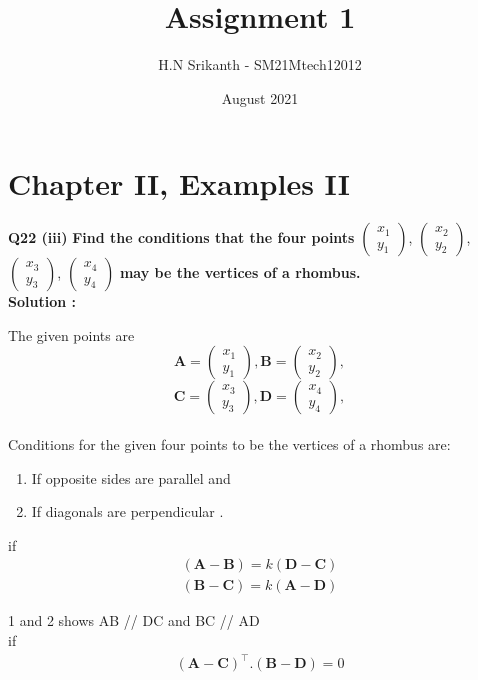 \documentclass{article}
\title{\textbf{\Huge Assignment 1}}
\author{\large H.N Srikanth - SM21Mtech12012}
\date{August 2021}
\begin{document}
\providecommand{\mbf}{\mathbf}

\newcommand{\myvec}[1]{\ensuremath{\begin{pmatrix}#1\end{pmatrix}}}
\let\vec\mathbf

\maketitle

\section*{Chapter II, Examples II}
\textbf{Q22 (iii)}
\textbf{Find the conditions that the four points}
\myvec{x_1\\y_1}, \myvec{x_2\\y_2},
\myvec{x_3\\y_3}, \myvec{x_4\\y_4}
\textbf{ may be the vertices of a rhombus.}\\

\textbf{Solution :}

The given points are\\

$$\vec{A} = \myvec{x_1\\y_1}, \vec{B} =\myvec{x_2\\y_2},$$
$$\vec{C} =\myvec{x_3\\y_3}, \vec{D} =\myvec{x_4\\y_4},$$\\

Conditions for the given four points to be the vertices of a rhombus are:
\begin{enumerate}
  \item If opposite sides are parallel and
  \item If diagonals are perpendicular .
\end{enumerate}

if
\begin{align}
(\vec{A}-\vec{B} ) = k(\vec{D}-\vec{C} )\\
(\vec{B}-\vec{C} )=k(\vec{A}-\vec{D} )
\end{align}

{1 and 2 shows AB // DC and BC // AD}\\

if 
\begin{align}
(\vec{A}-\vec{C} )^ \top. ( \vec{B}-\vec{D} ) = 0 
\end{align}
\end{document}
